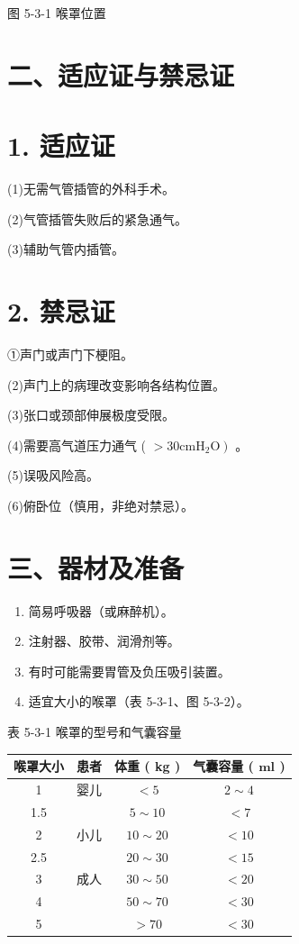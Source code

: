 \documentclass[10pt]{article}
\begin{document}
图 5-3-1 喉罩位置

\section*{二、适应证与禁忌证}
\section*{1. 适应证}
(1)无需气管插管的外科手术。

(2)气管插管失败后的紧急通气。

(3)辅助气管内插管。

\section*{2. 禁忌证}
①声门或声门下梗阻。

(2)声门上的病理改变影响各结构位置。

(3)张口或颈部伸展极度受限。

(4)需要高气道压力通气 ( $\left.>30 \mathrm{cmH}_{2} \mathrm{O}\right)$ 。

(5)误吸风险高。

(6)俯卧位（慎用，非绝对禁忌）。

\section*{三、器材及准备}
\begin{enumerate}
  \item 简易呼吸器（或麻醉机）。

  \item 注射器、胶带、润滑剂等。

  \item 有时可能需要胃管及负压吸引装置。

  \item 适宜大小的喉罩（表 5-3-1、图 5-3-2）。

\end{enumerate}

表 5-3-1 喉罩的型号和气囊容量

\begin{center}
\begin{tabular}{cccc}
\hline
喉罩大小 & 患者 & 体重 ( kg ) & 气囊容量 ( $\mathbf{m l}$ ) \\
\hline
1 & 婴儿 & $<5$ & $2 \sim 4$ \\
1.5 &  & $5 \sim 10$ & $<7$ \\
2 & 小儿 & $10 \sim 20$ & $<10$ \\
2.5 &  & $20 \sim 30$ & $<15$ \\
3 & 成人 & $30 \sim 50$ & $<20$ \\
4 &  & $50 \sim 70$ & $<30$ \\
5 &  & $>70$ & $<30$ \\
\hline
\end{tabular}
\end{center}
\end{document}
